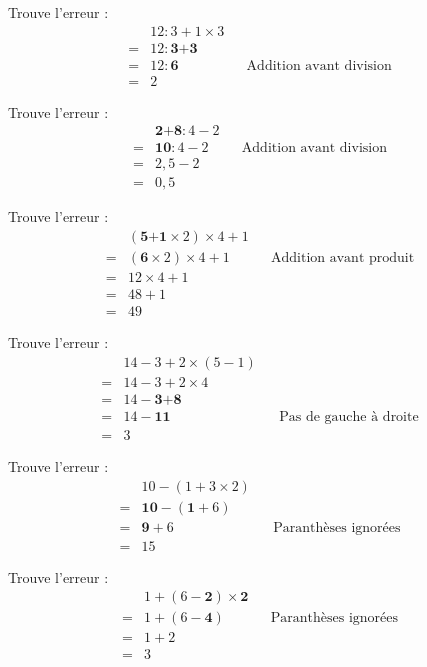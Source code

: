 \begin{multicols}{2}
  Trouve l'erreur :
  \begin{align*}
      &12:3+1\times 3&&\\
      =&12:\textbf{3+3}&&\\
      =&12:\textbf{6}&&\text{Addition avant division}\\
      =&2
  \end{align*}

  Trouve l'erreur :
  \begin{align*}
      &\textbf{2+8}:4-2&&\\
      =&\textbf{10}:4-2&&\text{Addition avant division}\\
      =&2,5-2&&\\
      =&0,5
  \end{align*}  
\end{multicols}

\begin{multicols}{2}
  Trouve l'erreur :
  \begin{align*}
      &(\textbf{5+1}\times 2)\times 4+1&&\\
      =&(\textbf{6}\times 2)\times 4+1&&\text{Addition avant produit}\\
      =&12\times 4+1&&\\
      =&48+1&&\\
      =&49
  \end{align*}

  Trouve l'erreur :
  \begin{align*}
      &14-3+2\times (5-1)&&\\
      =&14-3+2\times 4&&\\
      =&14-\textbf{3+8}&&\\
      =&14-\textbf{11}&&\text{Pas de gauche à droite}\\
      =&3
  \end{align*}
\end{multicols}

\begin{multicols}{2}
  Trouve l'erreur :
  \begin{align*}
      &10-(1+3\times 2)&&\\
      =&\textbf{10}-(\textbf{1}+6)&&\\
      =&\textbf{9}+6&&\text{Paranthèses ignorées}\\
      =&15
  \end{align*}

  Trouve l'erreur :
  \begin{align*}
      &1+(6-\textbf{2})\times \textbf{2}&&\\
      =&1+(6-\textbf{4})&&\text{Paranthèses ignorées}\\
      =&1+2&&\\
      =&3
  \end{align*}  
\end{multicols}

